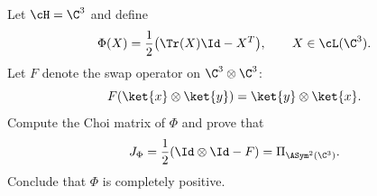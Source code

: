 Let $\cH=\C^3$ and define
$$
\Phi(X)=\frac{1}{2}\bigl(\Tr(X)\Id-X^T\bigr),
\qquad
X\in\cL(\C^3).
$$
Let $F$ denote the swap operator on $\C^3\otimes\C^3$:
$$
F(\ket{x}\otimes\ket{y})=\ket{y}\otimes\ket{x}.
$$
Compute the Choi matrix of $\Phi$ and prove that
$$
J_\Phi=\frac{1}{2}(\Id\otimes\Id-F)=\Pi_{\ASym^2(\C^3)}.
$$
Conclude that $\Phi$ is completely positive.
